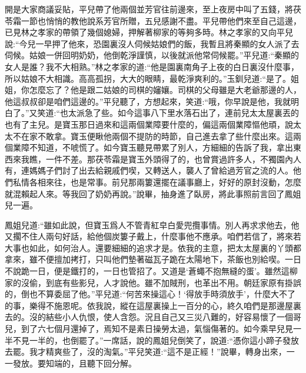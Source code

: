 \begin{parag}
    開是大家商議妥貼，平兒帶了他兩個並芳官往前邊來，至上夜房中叫了五錢，將茯苓霜一節也悄悄的教他說系芳官所贈，五兒感謝不盡。平兒帶他們來至自己這邊，已見林之孝家的帶領了幾個媳婦，押解著柳家的等夠多時。林之孝家的又向平兒說:“今兒一早押了他來，恐園裏沒人伺候姑娘們的飯，我暫且將秦顯的女人派了去伺候。姑娘一併回明奶奶，他倒乾淨謹慎，以後就派他常伺候罷。”平兒道:“秦顯的女人是誰？我不大相熟。”林之孝家的道:“他是園裏南角子上夜的白日裏沒什麼事，所以姑娘不大相識。高高孤拐，大大的眼睛，最乾淨爽利的。”玉釧兒道:“是了。姐姐，你怎麼忘了？他是跟二姑娘的司棋的嬸孃。司棋的父母雖是大老爺那邊的人，他這叔叔卻是咱們這邊的。”平兒聽了，方想起來，笑道:“哦，你早說是他，我就明白了。”又笑道:“也太派急了些。如今這事八下里水落石出了，連前兒太太屋裏丟的也有了主兒。是寶玉那日過來和這兩個業障要什麼的，偏這兩個業障慪他頑，說太太不在家不敢拿。寶玉便瞅他兩個不提防的時節，自己進去拿了些什麼出來。這兩個業障不知道，不唬慌了。如今寶玉聽見帶累了別人，方細細的告訴了我，拿出東西來我瞧，一件不差。那茯苓霜是寶玉外頭得了的，也曾賞過許多人，不獨園內人有，連媽媽子們討了出去給親戚們喫，又轉送人，襲人了曾給過芳官之流的人。他們私情各相來往，也是常事。前兒那兩簍還擺在議事廳上，好好的原封沒動，怎麼就混賴起人來。等我回了奶奶再說。”說畢，抽身進了臥房，將此事照前言回了鳳姐兒一遍。
\end{parag}


\begin{parag}
    鳳姐兒道:“雖如此說，但寶玉爲人不管青紅皁白愛兜攬事情。別人再求求他去，他又擱不住人兩句好話，給他個炭簍子戴上，什麼事他不應承。咱們若信了，將來若大事也如此，如何治人。還要細細的追求才是。依我的主意，把太太屋裏的丫頭都拿來，雖不便擅加拷打，只叫他們墊著磁瓦子跪在太陽地下，茶飯也別給喫。一日不說跪一日，便是鐵打的，一日也管招了。又道是‘蒼蠅不抱無縫的蛋’。雖然這柳家的沒偷，到底有些影兒，人才說他。雖不加賊刑，也革出不用。朝廷家原有掛誤的，倒也不算委屈了他。”平兒道:“何苦來操這心！‘得放手時須放手’，什麼大不了的事，樂得不施恩呢。依我說，縱在這屋裏操上一百分的心，終久咱們是那邊屋裏去的。沒的結些小人仇恨，使人含怨。況且自己又三災八難的，好容易懷了一個哥兒，到了六七個月還掉了，焉知不是素日操勞太過，氣惱傷著的。如今乘早兒見一半不見一半的，也倒罷了。”一席話，說的鳳姐兒倒笑了，說道:“憑你這小蹄子發放去罷。我才精爽些了，沒的淘氣。”平兒笑道:“這不是正經！”說畢，轉身出來，一一發放。要知端的，且聽下回分解。
\end{parag}
